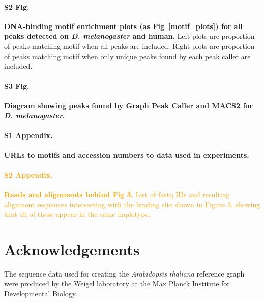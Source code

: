 \documentclass[10pt,letterpaper]{article}
\newcommand{\revision}[1]{\textcolor{orange}{#1}}
\begin{document}
\paragraph*{S2 Fig.}
\label{S2_Fig}
{\bf DNA-binding motif enrichment plots (as Fig~\ref{motif_plots}) for all peaks detected on \emph{D. melanogaster} and human.} Left plots are proportion of peaks matching motif when all peaks are included. Right plots are proportion of peaks matching motif when only unique peaks found by each peak caller are included.

\paragraph*{S3 Fig.}
\label{S3_Fig}
{\bf Diagram showing peaks found by Graph Peak Caller and MACS2 for \emph{D. melanogaster}.


\paragraph*{S1 Appendix.}
\label{S1_Appendix}
{\bf URLs to motifs and accession numbers to data used in experiments.}


\paragraph*{\revision{S2 Appendix.}}
\label{S2_Appendix}
\revision{{\bf Reads and alignments behind Fig 3.} List of fastq IDs and resulting alignment sequences intersecting with the binding site shown in Figure 3, showing that all of these appear in the same haplotype.}

\section*{Acknowledgements}
The sequence data used for creating the \emph{Arabidopsis thaliana} reference graph were produced by the Weigel laboratory at the Max Planck Institute for Developmental Biology.

\nolinenumbers

%
%
% 



}
\end{document}
